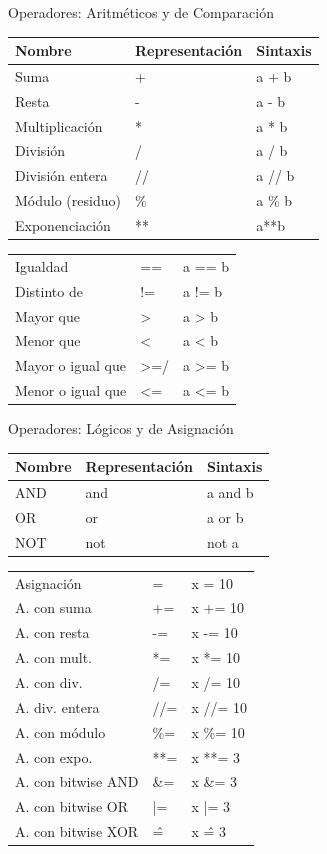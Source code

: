 \documentclass[11pt]{beamer}
\begin{document}
\begin{frame}{Operadores: Aritméticos y de Comparación}
\small
\begin{longtable}{p{3cm}p{3cm}p{8cm}}
	\toprule
	\textbf{Nombre} & \textbf{Representación} & \textbf{Sintaxis} \\
	\midrule
	Suma & + & a + b \\
	Resta & - & a - b \\
	Multiplicación & * & a * b \\
	División & / & a / b \\
	División entera & // & a // b \\
	Módulo (residuo) & \% & a \% b \\
	Exponenciación & ** & a**b \\
	\bottomrule
\end{longtable}
\begin{longtable}{p{3cm}p{3cm}p{8cm}}
	\toprule
	Igualdad & == & a == b \\
	Distinto de & != & a != b \\
	Mayor que & > & a > b \\
	Menor que & < & a < b \\
	Mayor o igual que & >=/ & a >= b \\
	Menor o igual que & <= & a <= b \\
	\bottomrule
\end{longtable}
\end{frame}		
	
\begin{frame}{Operadores: Lógicos y de Asignación}
	\small
	\begin{longtable}{p{3cm}p{3cm}p{8cm}}
		\toprule
		\textbf{Nombre} & \textbf{Representación} & \textbf{Sintaxis} \\
		\midrule
		AND & and & a and b \\
		OR & or & a or b \\
		NOT & not & not a \\
		\bottomrule
	\end{longtable}
	\begin{longtable}{p{3cm}p{3cm}p{8cm}}
		\toprule
		Asignación & = & x = 10 \\
		A. con suma & += & x += 10 \\
		A. con resta & -= & x -= 10 \\
		A. con mult. & *= & x *= 10 \\
		A. con div. & /= & x /= 10 \\
		A. div. entera & //= & x //= 10 \\
		A. con módulo & \%= & x \%= 10 \\
		A. con expo. & **= & x **= 3 \\
		A. con bitwise AND & \&= & x \&= 3 \\
		A. con bitwise OR & |= & x |= 3 \\
		A. con bitwise XOR & \^= & x \^= 3 \\
		\bottomrule
	\end{longtable}
\end{frame}			
\end{document}
